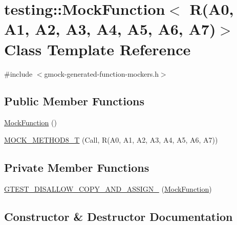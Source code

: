\hypertarget{classtesting_1_1_mock_function_3_01_r_07_a0_00_01_a1_00_01_a2_00_01_a3_00_01_a4_00_01_a5_00_01_a6_00_01_a7_08_4}{}\section{testing\+::Mock\+Function$<$ R(A0, A1, A2, A3, A4, A5, A6, A7)$>$ Class Template Reference}
\label{classtesting_1_1_mock_function_3_01_r_07_a0_00_01_a1_00_01_a2_00_01_a3_00_01_a4_00_01_a5_00_01_a6_00_01_a7_08_4}


{\ttfamily \#include $<$gmock-\/generated-\/function-\/mockers.\+h$>$}

\subsection*{Public Member Functions}
\begin{DoxyCompactItemize}
\item 
\mbox{\hyperlink{classtesting_1_1_mock_function_3_01_r_07_a0_00_01_a1_00_01_a2_00_01_a3_00_01_a4_00_01_a5_00_01_a6_00_01_a7_08_4_ab2ac033046600396f088321ef0508e63}{Mock\+Function}} ()
\item 
\mbox{\hyperlink{classtesting_1_1_mock_function_3_01_r_07_a0_00_01_a1_00_01_a2_00_01_a3_00_01_a4_00_01_a5_00_01_a6_00_01_a7_08_4_a895c470e00e07294ab42c09588ae1e4c}{M\+O\+C\+K\+\_\+\+M\+E\+T\+H\+O\+D8\+\_\+T}} (Call, R(A0, A1, A2, A3, A4, A5, A6, A7))
\end{DoxyCompactItemize}
\subsection*{Private Member Functions}
\begin{DoxyCompactItemize}
\item 
\mbox{\hyperlink{classtesting_1_1_mock_function_3_01_r_07_a0_00_01_a1_00_01_a2_00_01_a3_00_01_a4_00_01_a5_00_01_a6_00_01_a7_08_4_a445a7908911449f9317225121af6a476}{G\+T\+E\+S\+T\+\_\+\+D\+I\+S\+A\+L\+L\+O\+W\+\_\+\+C\+O\+P\+Y\+\_\+\+A\+N\+D\+\_\+\+A\+S\+S\+I\+G\+N\+\_\+}} (\mbox{\hyperlink{classtesting_1_1_mock_function}{Mock\+Function}})
\end{DoxyCompactItemize}


\subsection{Constructor \& Destructor Documentation}
\mbox{\label{classtesting_1_1_mock_function_3_01_r_07_a0_00_01_a1_00_01_a2_00_01_a3_00_01_a4_00_01_a5_00_01_a6_00_01_a7_08_4_ab2ac033046600396f088321ef0508e63}} 

